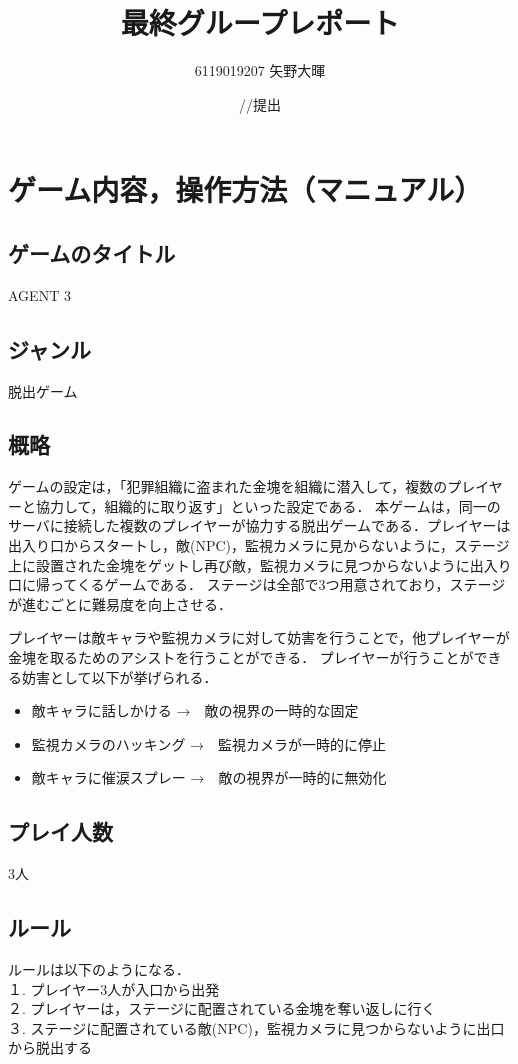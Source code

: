\documentclass{jarticle}
\title{最終グループレポート}
\author{6119019207 矢野大暉}
\date{\number\year/\number\month/\number\day 提出}
\begin{document}
\maketitle

\section{ゲーム内容，操作方法（マニュアル）}
\subsection{ゲームのタイトル}
AGENT 3

\subsection{ジャンル}
脱出ゲーム

\subsection{概略}
ゲームの設定は，「犯罪組織に盗まれた金塊を組織に潜入して，複数のプレイヤーと協力して，組織的に取り返す」といった設定である．
本ゲームは，同一のサーバに接続した複数のプレイヤーが協力する脱出ゲームである．プレイヤーは出入り口からスタートし，敵(NPC)，監視カメラに見からないように，ステージ上に設置された金塊をゲットし再び敵，監視カメラに見つからないように出入り口に帰ってくるゲームである．
ステージは全部で3つ用意されており，ステージが進むごとに難易度を向上させる．

プレイヤーは敵キャラや監視カメラに対して妨害を行うことで，他プレイヤーが金塊を取るためのアシストを行うことができる．
プレイヤーが行うことができる妨害として以下が挙げられる．
\begin{itemize}
\item 敵キャラに話しかける →　敵の視界の一時的な固定
\item 監視カメラのハッキング →　監視カメラが一時的に停止
\item 敵キャラに催涙スプレー →　敵の視界が一時的に無効化
\end{itemize}

\subsection{プレイ人数}
3人

\subsection{ルール}
ルールは以下のようになる．\\
１.	プレイヤー3人が入口から出発\\
２.	プレイヤーは，ステージに配置されている金塊を奪い返しに行く\\
３.	ステージに配置されている敵(NPC)，監視カメラに見つからないように出口から脱出する\\
\end{document}
